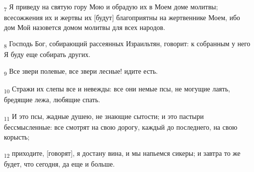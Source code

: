 \begin{tcolorbox}
\textsubscript{7} Я приведу на святую гору Мою и обрадую их в Моем доме молитвы; всесожжения их и жертвы их [будут] благоприятны на жертвеннике Моем, ибо дом Мой назовется домом молитвы для всех народов.
\end{tcolorbox}
\begin{tcolorbox}
\textsubscript{8} Господь Бог, собирающий рассеянных Израильтян, говорит: к собранным у него Я буду еще собирать других.
\end{tcolorbox}
\begin{tcolorbox}
\textsubscript{9} Все звери полевые, все звери лесные! идите есть.
\end{tcolorbox}
\begin{tcolorbox}
\textsubscript{10} Стражи их слепы все и невежды: все они немые псы, не могущие лаять, бредящие лежа, любящие спать.
\end{tcolorbox}
\begin{tcolorbox}
\textsubscript{11} И это псы, жадные душею, не знающие сытости; и это пастыри бессмысленные: все смотрят на свою дорогу, каждый до последнего, на свою корысть;
\end{tcolorbox}
\begin{tcolorbox}
\textsubscript{12} приходите, [говорят], я достану вина, и мы напьемся сикеры; и завтра то же будет, что сегодня, да еще и больше.
\end{tcolorbox}
